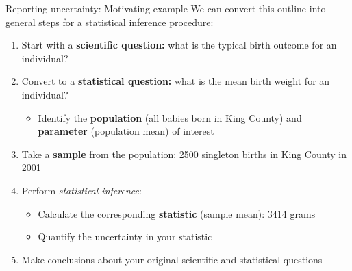 \documentclass[10pt,t]{beamer}
\begin{document}
\begin{frame}{Reporting uncertainty: Motivating example}
We can convert this outline into general steps for a statistical inference procedure:

\vspace{0.3cm}

\begin{enumerate}
	\item Start with a \textbf{scientific question:} what is the typical birth outcome for an individual?
	\item Convert to a \textbf{statistical question:} what is the mean birth weight for an individual?
	\begin{itemize}
		\item Identify the \textbf{population} (all babies born in King County) and \textbf{parameter} (population mean) of interest
	\end{itemize}
	\item Take a \textbf{sample} from the population: 2500 singleton births in King County in 2001
	\item Perform \textit{statistical inference}:
	\begin{itemize}
		\item Calculate the corresponding \textbf{statistic} (sample mean): 3414 grams
		\item Quantify the uncertainty in your statistic
	\end{itemize}
	\item Make conclusions about your original scientific and statistical questions
\end{enumerate}
\end{frame}
\end{document}
